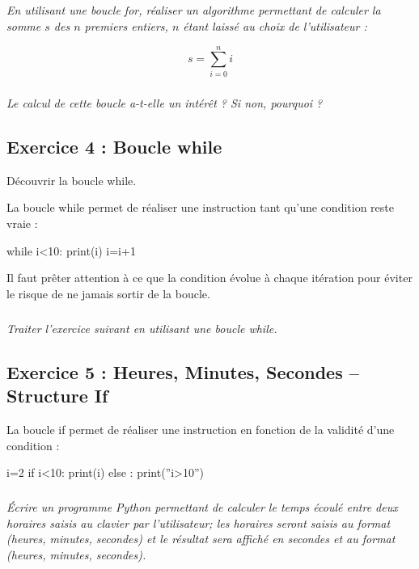 \documentclass[10pt]{article}
\begin{document}
\subparagraph{}
\textit{En utilisant une boucle \textsf{for}, réaliser un algorithme permettant de calculer la somme $s$ des $n$ premiers entiers, $n$ étant laissé au choix de l’utilisateur :}

$$
s = \sum\limits_{i=0}^{n} i
$$

\subparagraph{}
\textit{Le calcul de cette boucle a-t-elle un intérêt ? Si non, pourquoi ?}


\subsection*{Exercice 4 : Boucle while}
\setcounter{subparagraph}{0}
\begin{obj}
Découvrir la boucle \textsf{while}.
\end{obj}

\begin{py}
La boucle \textsf{while} permet de réaliser une instruction tant qu’une condition reste vraie :
\begin{python}
while i<10:
    print(i)
    i=i+1
\end{python}
\end{py}

\begin{warn}
Il faut prêter attention à ce que la condition évolue à chaque itération pour éviter le risque de ne jamais sortir de la boucle.
\end{warn}

\subparagraph*{}
\textit{Traiter l'exercice suivant en utilisant une boucle \textsf{while}.}

\subsection*{Exercice 5 : Heures, Minutes, Secondes -- Structure \textsf{If}}
\setcounter{subparagraph}{0}
\begin{py}
La boucle \textsf{if} permet de réaliser une instruction en fonction de la validité d’une condition :
\begin{python}
i=2
if i<10:
    print(i)
else :
    print(''i>10'')
\end{python}
\end{py}

\subparagraph*{}
\textit{Écrire un programme Python permettant de calculer le temps écoulé entre deux horaires saisis au clavier par l'utilisateur; les horaires seront saisis au format (heures, minutes, secondes) et le résultat sera affiché en secondes et au format (heures, minutes, secondes).}
\end{document}
